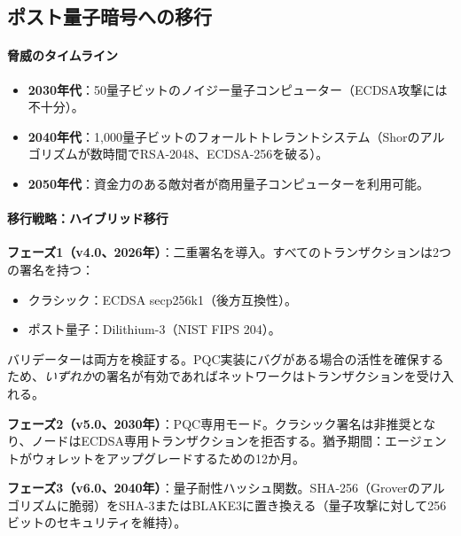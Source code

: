 \documentclass[11pt]{article}
\begin{document}
\subsection{ポスト量子暗号への移行}

\paragraph{脅威のタイムライン}
\begin{itemize}[noitemsep]
  \item \textbf{2030年代}：50量子ビットのノイジー量子コンピューター（ECDSA攻撃には不十分）。
  \item \textbf{2040年代}：1,000量子ビットのフォールトトレラントシステム（Shorのアルゴリズムが数時間でRSA-2048、ECDSA-256を破る）。
  \item \textbf{2050年代}：資金力のある敵対者が商用量子コンピューターを利用可能。
\end{itemize}

\paragraph{移行戦略：ハイブリッド移行}
\textbf{フェーズ1（v4.0、2026年）}：二重署名を導入。すべてのトランザクションは2つの署名を持つ：
\begin{itemize}[noitemsep]
  \item クラシック：ECDSA secp256k1（後方互換性）。
  \item ポスト量子：Dilithium-3（NIST FIPS 204）。
\end{itemize}
バリデーターは両方を検証する。PQC実装にバグがある場合の活性を確保するため、\emph{いずれか}の署名が有効であればネットワークはトランザクションを受け入れる。

\textbf{フェーズ2（v5.0、2030年）}：PQC専用モード。クラシック署名は非推奨となり、ノードはECDSA専用トランザクションを拒否する。猶予期間：エージェントがウォレットをアップグレードするための12か月。

\textbf{フェーズ3（v6.0、2040年）}：量子耐性ハッシュ関数。SHA-256（Groverのアルゴリズムに脆弱）をSHA-3またはBLAKE3に置き換える（量子攻撃に対して256ビットのセキュリティを維持）。
\end{document}
